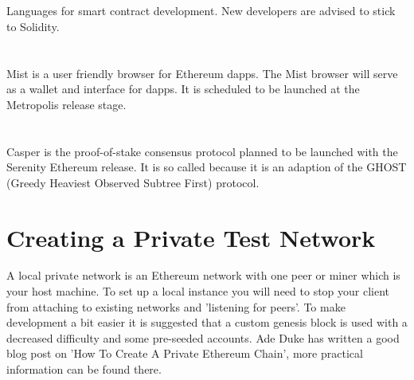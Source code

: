 \\
\\
Languages for smart contract development. New developers are advised to stick to Solidity.\\
\\
\\
Mist is a user friendly browser for Ethereum dapps. The Mist browser will serve as a wallet and interface for dapps. It is scheduled to be launched at the Metropolis release stage.\\
\\
\\
Casper is the proof-of-stake consensus protocol planned to be launched with the Serenity Ethereum release. It is so called because it is an adaption of the GHOST (Greedy Heaviest Observed Subtree First) protocol.\\

\section{Creating a Private Test Network}
A local private network is an Ethereum network with one peer or miner which is your host machine. To set up a local instance you will need to stop your client from attaching to existing networks and 'listening for peers'. To make development a bit easier it is suggested that a custom genesis block is used with a decreased difficulty and some pre-seeded accounts. Ade Duke has written a good blog post on 'How To Create A Private Ethereum Chain'\cite{AdeDuke}, more practical information can be found there.\\





